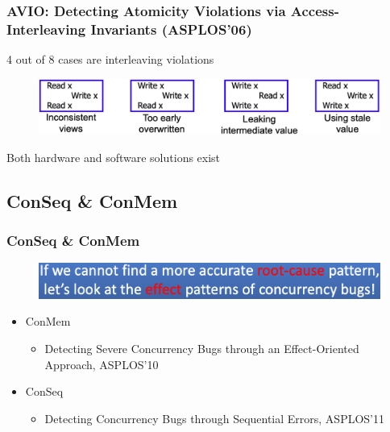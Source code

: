 % 
\begin{frame}[fragile]
    \frametitle{AVIO: \small{Detecting Atomicity Violations via Access-Interleaving Invariants (ASPLOS’06)}}

4 out of 8 cases are interleaving violations

    \begin{figure}
    \includegraphics[width=1.0\linewidth]{figs/interleaving-violations.png}
    \end{figure} \pause

Both hardware and software solutions exist

\end{frame}
% 
% 
% 
% 
% 
% 
% 
\subsection{ConSeq \& ConMem} %
\begin{frame}[fragile]
    \frametitle{ConSeq \& ConMem}
    \begin{figure}
    \includegraphics[width=0.85\linewidth]{figs/ConSeq-idea.png}
    \end{figure} \pause

    \begin{itemize}
	    \item ConMem
    	\begin{itemize}
    	    \item Detecting Severe Concurrency Bugs through an Effect-Oriented Approach, ASPLOS’10
    	\end{itemize} \pause
	    \item ConSeq
    	\begin{itemize}
    	    \item Detecting Concurrency Bugs through Sequential Errors, ASPLOS’11
    	\end{itemize}
	\end{itemize}
\end{frame}

